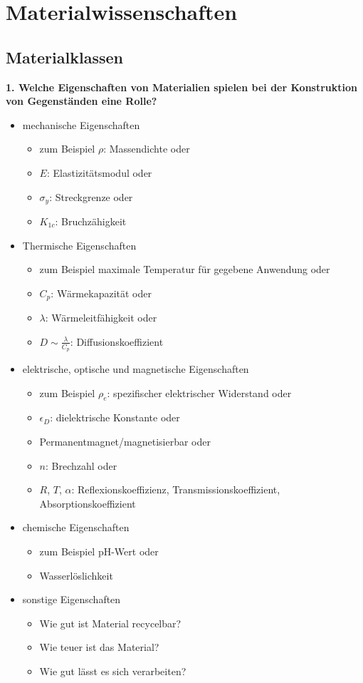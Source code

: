 \section{Materialwissenschaften}
\subsection{Materialklassen}

\noindent\textbf{1. Welche Eigenschaften von Materialien spielen bei der Konstruktion von Gegenständen eine Rolle?}
\indent \begin{itemize}
\item mechanische Eigenschaften
\begin{itemize}
    \item zum Beispiel $\rho$: Massendichte oder
    \item $E$: Elastizitätsmodul oder 
    \item $\sigma_y$: Streckgrenze oder
    \item $K_{1c}$: Bruchzähigkeit
\end{itemize}
    \item Thermische Eigenschaften
    \begin{itemize}
        \item  zum Beispiel maximale Temperatur für gegebene Anwendung oder
        \item $C_p$: Wärmekapazität oder
        \item $\lambda$: Wärmeleitfähigkeit oder
        \item $D \sim \frac{\lambda}{C_p}$: Diffusionskoeffizient
    \end{itemize}
    \item elektrische, optische und magnetische Eigenschaften
    \begin{itemize}
        \item zum Beispiel $\rho_e$: spezifischer elektrischer Widerstand oder
        \item $\epsilon_D$: dielektrische Konstante oder
        \item Permanentmagnet/magnetisierbar oder 
        \item $n$: Brechzahl oder
        \item $R$, $T$, $\alpha$: Reflexionskoeffizienz, Transmissionskoeffizient, Absorptionskoeffizient
    \end{itemize}
    \item chemische Eigenschaften
    \begin{itemize}
        \item zum Beispiel pH-Wert oder
        \item Wasserlöslichkeit 
    \end{itemize}
    \item sonstige Eigenschaften
    \begin{itemize}
        \item Wie gut ist Material recycelbar? 
        \item Wie teuer ist das Material?
        \item Wie gut lässt es sich verarbeiten?
    \end{itemize}
\end{itemize}

